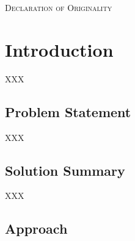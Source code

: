 \documentclass[12pt]{article} %
\begin{document}
		\begin{flushleft}\large
			\textsc{Declaration of Originality}\\
			
			
		\end{flushleft}
	
	
	\tableofcontents %
	
	\newpage %
	
	
	\section{Introduction} %
	
XXX

\subsection{Problem Statement}

XXX

\subsection{Solution Summary}

XXX

\subsection{Approach}

	
		
		
\end{document}
